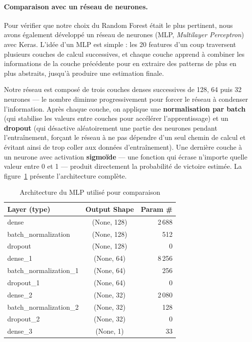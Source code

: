 \documentclass[a4paper]{article}
\begin{document}
\paragraph{Comparaison avec un réseau de neurones.}
Pour vérifier que notre choix du Random Forest était le plus pertinent, nous
avons également développé un réseau de neurones (MLP, \textit{Multilayer
Perceptron}) avec Keras. L'idée d'un MLP est simple : les 20 features d'un
coup traversent plusieurs couches de calcul successives, et chaque couche
apprend à combiner les informations de la couche précédente pour en extraire
des patterns de plus en plus abstraits, jusqu'à produire une estimation
finale.

Notre réseau est composé de trois couches denses successives de 128, 64
puis 32 neurones — le nombre diminue progressivement pour forcer le réseau
à condenser l'information. Après chaque couche, on applique une
\textbf{normalisation par batch} (qui stabilise les valeurs entre couches
pour accélérer l'apprentissage) et un \textbf{dropout} (qui désactive
aléatoirement une partie des neurones pendant l'entraînement, forçant le
réseau à ne pas dépendre d'un seul chemin de calcul et évitant ainsi de
trop coller aux données d'entraînement). Une dernière couche à un neurone
avec activation \textbf{sigmoïde} — une fonction qui écrase n'importe
quelle valeur entre 0 et 1 — produit directement la probabilité de
victoire estimée. La figure~\ref{fig:nn-architecture} présente
l'architecture complète.

\begin{table}[H]
  \centering
  \setlength{\tabcolsep}{8pt}
  \renewcommand{\arraystretch}{1.4}
  \begin{tabular}{|l|c|r|}
    \hline
    \rowcolor{LightSteelBlue!35}
    \textbf{Layer (type)} & \textbf{Output Shape} & \textbf{Param \#} \\
    \hline
    dense                   & (None, 128) & 2\,688 \\
    \hline
    \rowcolor{AliceBlue!40}
    batch\_normalization     & (None, 128) & 512 \\
    \hline
    dropout                 & (None, 128) & 0 \\
    \hline
    dense\_1                 & (None, 64)  & 8\,256 \\
    \hline
    \rowcolor{AliceBlue!40}
    batch\_normalization\_1  & (None, 64)  & 256 \\
    \hline
    dropout\_1               & (None, 64)  & 0 \\
    \hline
    dense\_2                 & (None, 32)  & 2\,080 \\
    \hline
    \rowcolor{AliceBlue!40}
    batch\_normalization\_2  & (None, 32)  & 128 \\
    \hline
    dropout\_2               & (None, 32)  & 0 \\
    \hline
    dense\_3                 & (None, 1)   & 33 \\
    \hline
  \end{tabular}
  \caption{Architecture du MLP utilisé pour comparaison}
  \label{fig:nn-architecture}
\end{table}
\end{document}
